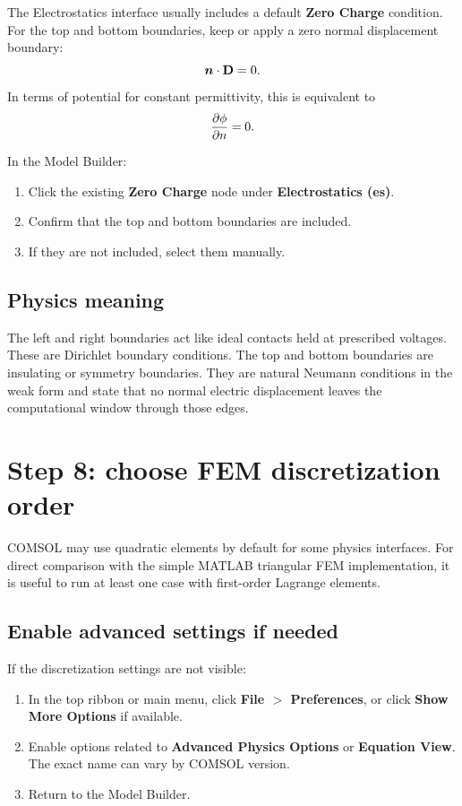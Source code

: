 \documentclass[11pt]{article}
\newcommand{\Dvec}{\mathbf{D}}
\begin{document}
The Electrostatics interface usually includes a default \textbf{Zero Charge} condition. For the top and bottom boundaries, keep or apply a zero normal displacement boundary:
\begin{equation}
\nvec\cdot\Dvec=0.
\end{equation}
In terms of potential for constant permittivity, this is equivalent to
\begin{equation}
\pdv{\phi}{n}=0.
\end{equation}

In the Model Builder:
\begin{enumerate}[leftmargin=2em]
\item Click the existing \textbf{Zero Charge} node under \textbf{Electrostatics (es)}.
\item Confirm that the top and bottom boundaries are included.
\item If they are not included, select them manually.
\end{enumerate}

\subsection{Physics meaning}

The left and right boundaries act like ideal contacts held at prescribed voltages. These are Dirichlet boundary conditions. The top and bottom boundaries are insulating or symmetry boundaries. They are natural Neumann conditions in the weak form and state that no normal electric displacement leaves the computational window through those edges.

\section{Step 8: choose FEM discretization order}

COMSOL may use quadratic elements by default for some physics interfaces. For direct comparison with the simple MATLAB triangular FEM implementation, it is useful to run at least one case with first-order Lagrange elements.

\subsection{Enable advanced settings if needed}

If the discretization settings are not visible:
\begin{enumerate}[leftmargin=2em]
\item In the top ribbon or main menu, click \textbf{File $>$ Preferences}, or click \textbf{Show More Options} if available.
\item Enable options related to \textbf{Advanced Physics Options} or \textbf{Equation View}. The exact name can vary by COMSOL version.
\item Return to the Model Builder.
\end{enumerate}
\end{document}
